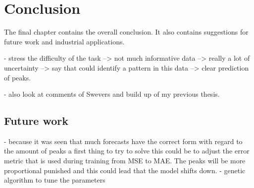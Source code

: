 \chapter{Conclusion}
\label{cha:conclusion}
The final chapter contains the overall conclusion. It also contains
suggestions for future work and industrial applications.



- stress the difficulty of the task --> not much informative data --> really a lot of uncertainty --> say that could identify a pattern in this data --> clear prediction of peaks.

- also look at comments of Swevers and build up of my previous thesis.

\section{Future work}
- because it was seen that much forecasts have the correct form with regard to the amount of peaks a first thing to try to solve this could be to adjust the error metric that is used during training from MSE to MAE. The peaks will be more proportional punished and this could lead that the model shifts down. 
- genetic algorithm to tune the parameters

